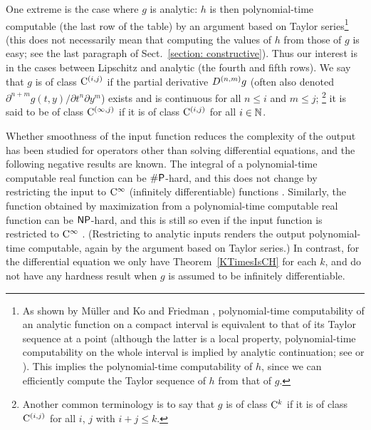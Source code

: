 One extreme is the case where $g$ is analytic: 
$h$ is then polynomial-time computable 
(the last row of the table) 
by an argument based on Taylor series\footnote{
As shown by M\"uller \cite{muller1987uniform} and 
Ko and Friedman \cite{ko1988computing}, 
polynomial-time computability of an analytic function 
on a compact interval is 
equivalent to that of its Taylor sequence at a point 
(although the latter is a local property, 
polynomial-time computability on the whole interval is implied 
by analytic continuation; 
see \cite[Corollary~4.5]{muller1987uniform}
or \cite[Theorem~11]{kawamura2010complexity}). 
This implies the polynomial-time computability of $h$, 
since we can efficiently compute the 
Taylor sequence of $h$ from that of $g$. 
} (this does not necessarily mean that 
computing the values of $h$ from those of $g$ is easy; 
see the last paragraph of Sect.~\ref{section: constructive}). 
Thus our interest is in 
the cases between Lipschitz and analytic 
(the fourth and fifth rows). 
We say that $g$ is of class $\mathrm C ^{(i, j)}$
if the partial derivative $D ^{(n, m)} g$ 
(often also denoted $\partial ^{n + m} g (t, y) / \partial t ^n \partial y ^m$)
exists and is continuous for all $n \le i$ and $m \le j$;%
\footnote{%
Another common terminology is to say that $g$ is of class $\mathrm C ^k$
if it is of class $\mathrm C ^{(i,j)}$ 
for all $i$, $j$ with $i + j \leq k$.}
it is said to be of class $\mathrm C ^{(\infty, j)}$ if
it is of class $\mathrm C ^{(i, j)}$ for all $i \in \mathbb N$. 

Whether smoothness of the input function 
reduces the complexity of the output
has been studied for operators other than solving differential equations, 
and the following negative results are known. 
The integral of a polynomial-time computable real function 
can be $\mathsf{\#P}$-hard, and this does not change 
by restricting the input to 
$\mathrm C ^\infty$ (infinitely differentiable) functions
\cite[Theorem~5.33]{ko1991complexity}. 
Similarly, the function obtained by maximization 
from a polynomial-time computable real function 
can be $\mathsf{NP}$-hard, and this is still so
even if the input function is restricted to $\mathrm C ^\infty$ 
\cite[Theorem~3.7]{ko1991complexity}.
(Restricting to analytic inputs 
renders the output polynomial-time computable, 
again by the argument based on Taylor series.)
In contrast, for the differential equation
we only have Theorem~\ref{KTimesIsCH} for each $k$, 
and do not have any hardness result 
when $g$ is assumed to be infinitely differentiable. 



